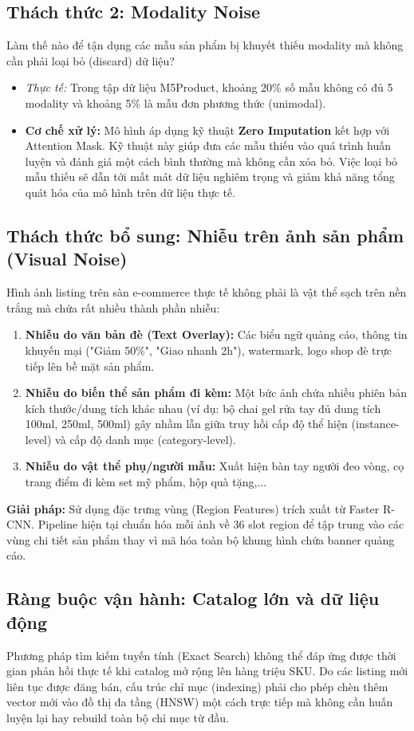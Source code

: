 \documentclass[10pt,conference]{IEEEtran}
\begin{document}
\subsection{Thách thức 2: Modality Noise}
Làm thế nào để tận dụng các mẫu sản phẩm bị khuyết thiếu modality mà không cần phải loại bỏ (discard) dữ liệu?
\begin{itemize}[leftmargin=*]
    \item \textit{Thực tế:} Trong tập dữ liệu M5Product, khoảng 20\% số mẫu không có đủ 5 modality và khoảng 5\% là mẫu đơn phương thức (unimodal).
    \item \textbf{Cơ chế xử lý:} Mô hình áp dụng kỹ thuật \textbf{Zero Imputation} kết hợp với Attention Mask. Kỹ thuật này giúp đưa các mẫu thiếu vào quá trình huấn luyện và đánh giá một cách bình thường mà không cần xóa bỏ. Việc loại bỏ mẫu thiếu sẽ dẫn tới mất mát dữ liệu nghiêm trọng và giảm khả năng tổng quát hóa của mô hình trên dữ liệu thực tế.
\end{itemize}

\subsection{Thách thức bổ sung: Nhiễu trên ảnh sản phẩm (Visual Noise)}
Hình ảnh listing trên sàn e-commerce thực tế không phải là vật thể sạch trên nền trắng mà chứa rất nhiều thành phần nhiễu:
\begin{enumerate}[leftmargin=*]
    \item \textbf{Nhiễu do văn bản đè (Text Overlay):} Các biểu ngữ quảng cáo, thông tin khuyến mại ("Giảm 50\%", "Giao nhanh 2h"), watermark, logo shop đè trực tiếp lên bề mặt sản phẩm.
    \item \textbf{Nhiễu do biến thể sản phẩm đi kèm:} Một bức ảnh chứa nhiều phiên bản kích thước/dung tích khác nhau (ví dụ: bộ chai gel rửa tay đủ dung tích 100ml, 250ml, 500ml) gây nhầm lẫn giữa truy hồi cấp độ thể hiện (instance-level) và cấp độ danh mục (category-level).
    \item \textbf{Nhiễu do vật thể phụ/người mẫu:} Xuất hiện bàn tay người đeo vòng, cọ trang điểm đi kèm set mỹ phẩm, hộp quà tặng,...
\end{enumerate}
\textbf{Giải pháp:} Sử dụng đặc trưng vùng (Region Features) trích xuất từ Faster R-CNN. Pipeline hiện tại chuẩn hóa mỗi ảnh về 36 slot region để tập trung vào các vùng chi tiết sản phẩm thay vì mã hóa toàn bộ khung hình chứa banner quảng cáo.

\subsection{Ràng buộc vận hành: Catalog lớn và dữ liệu động}
Phương pháp tìm kiếm tuyến tính (Exact Search) không thể đáp ứng được thời gian phản hồi thực tế khi catalog mở rộng lên hàng triệu SKU. Do các listing mới liên tục được đăng bán, cấu trúc chỉ mục (indexing) phải cho phép chèn thêm vector mới vào đồ thị đa tầng (HNSW) một cách trực tiếp mà không cần huấn luyện lại hay rebuild toàn bộ chỉ mục từ đầu.
\end{document}
